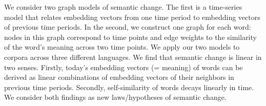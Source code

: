 We consider two graph models of semantic change. The first is a time-series model that relates embedding vectors from one time period to embedding vectors of previous time periods. In the second, we construct one graph for each word: nodes in this graph correspond to time points and edge weights to the similarity of the word's meaning across two time points. We apply our two models to corpora across three different languages. We find that semantic change is linear in two senses. Firstly, today's embedding vectors (= meaning) of words can be derived as linear combinations of embedding vectors of their neighbors in previous time periods. Secondly, self-similarity of words decays linearly in time. We consider both findings as new laws/hypotheses of semantic change.
